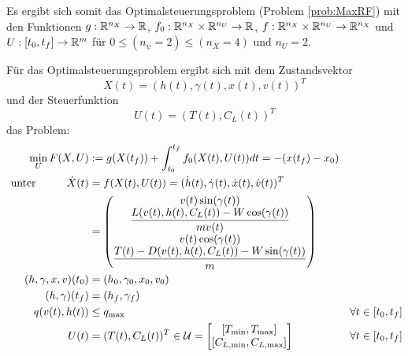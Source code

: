 Es ergibt sich somit das Optimalsteuerungsproblem (Problem \ref{prob:MaxRF}) mit den Funktionen $g : \mathbb{R}^{n_X} \to \mathbb{R}$, $f_0 : \mathbb{R}^{n_X} \times \mathbb{R}^{n_U} \to \mathbb{R}$, $f : \mathbb{R}^{n_X} \times \mathbb{R}^{n_U} \to \mathbb{R}^{n_X}$ und $U : [t_0,t_f] \to \mathbb{R}^m$ für $0 \leq (n_{\psi} = 2) \leq (n_X = 4)$ und $n_U = 2$.

\begin{problem}\label{prob:MaxRF}
Für das Optimalsteuerungsproblem ergibt sich mit dem Zustandsvektor
\[X(t) = (h(t),\gamma(t),x(t),v(t))^T\]
und der Steuerfunktion
\[U(t) = (T(t),C_L(t))^T\]
das Problem:
\begin{align*}
\min_{U} F(X,U) &:= g(X(t_f)) + \int_{t_0}^{t_f} f_0(X(t),U(t)) dt = -(x(t_f) - x_0) & & \\\
\text{unter} \hspace{10mm} \dot{X}(t) &= f(X(t),U(t)) = (\dot{h}(t),\dot{\gamma}(t),\dot{x}(t),\dot{v}(t))^T  & & \\\
&= \begin{pmatrix}
v(t) \sin(\gamma(t)) \\ 
\dfrac{L(v(t),h(t),C_L(t)) - W \cos(\gamma(t))}{mv(t)} \\ 
v(t) \cos(\gamma(t)) \\ 
\dfrac{T(t) - D(v(t),h(t),C_L(t)) - W \sin(\gamma(t))}{m}
\end{pmatrix} & & \\\
(h,\gamma,x,v)(t_0) &= (h_0,\gamma_0,x_0,v_0) & & \\\
(h,\gamma)(t_f) &= (h_f,\gamma_f) & & \\\
q(v(t),h(t)) &\leq q_{\max} & & \forall t \in [t_0,t_f]\\\
U(t) &= (T(t),C_L(t))^T \in \mathcal{U} = \left[ \begin{matrix}
[T_{\min},T_{\max}] \\ 
[C_{L, \min},C_{L, \max}]
\end{matrix} 
\right] & & \forall t \in [t_0,t_f]
\end{align*}
\end{problem}

